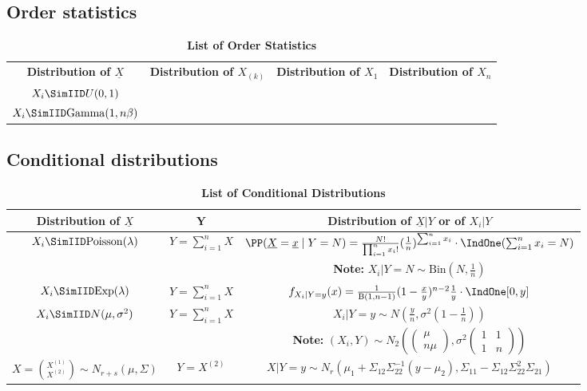 \newpage
\subsection{Order statistics}
\begin{table}[h]
	\centering
	\begin{tabular}{ c | c | c | c }
		\hline
		\textbf{Distribution of $\underline{X}$} & \textbf{Distribution of $X_{(k)}$} & \textbf{Distribution of $X_{1}$} & \textbf{Distribution of $X_{n}$}  \\ 
		$X_i \SimIID U(0,1)$ & & & \\
		$X_i \SimIID \mathrm{Gamma}(1, n\beta)$ & & & \\ 
		\hline 
	\end{tabular} 
	\caption{\textbf{List of Order Statistics}}
	\label{tab:OrderStat}
\end{table} 

\subsection{Conditional distributions}
\begin{table}[h]
	\centering
\begin{tabular}{ c | c | c }
	\hline
	\textbf{Distribution of $\underline{X}$} & $\boldsymbol{Y}$ & \textbf{Distribution of $\underline{X}|Y$ or of $X_i|Y$} \\ 
	\hline 
	  $X_i \SimIID \mathrm{Poisson}(\lambda)$  & $Y = \sum_{i=1}^n X$ & $\PP( \underline{X}=\underline{x} \mid Y=N ) = \frac{N!}{\prod_{i=1}^n x_i!} ( \frac{1}{n} )^{\sum_{i=1}^n x_i} \cdot \IndOne(\sum_{i=1}^n x_i = N)$ \\
	 & & {\textbf{Note:}  $X_i | Y = N \sim \mathrm{Bin}(N, \frac{1}{n}) $ } \\
	 $X_i \SimIID \mathrm{Exp}(\lambda)$ & $Y = \sum_{i=1}^n X$ & $f_{X_i|Y=y}(x) = \frac{1}{\mathrm{B}(1,n-1)} (1- \frac{x}{y})^{n-2}  \frac{1}{y} \cdot \IndOne[0,y]$\\
	$X_i \SimIID N(\mu, \sigma^2)$ & $Y = \sum_{i=1}^n X$ & $X_i|Y=y \sim N(\frac{y}{n}, \sigma^2(1-\frac{1}{n}))$\\
	& & {\textbf{Note:} $(X_i, Y) \sim N_2( \begin{pmatrix}
		\mu \\
		n\mu
		\end{pmatrix}, \sigma^2 \begin{pmatrix}
		1 & 1 \\
		1& n 
		\end{pmatrix} )$}\\
	$X = \binom{X^{(1)}}{X^{(2)}} \sim N_{r+s}(\mu, \Sigma )$ & $Y = X^{(2)}$ & $X|Y=y \sim N_r( \mu_1 + \Sigma_{12}\Sigma^{-1}_{22}(y-\mu_2), \Sigma_{11} - \Sigma_{12}\Sigma^2_{22} \Sigma_{21} )$\\
	\hline 
\end{tabular} 
	\caption{\textbf{List of Conditional Distributions}}
	\label{tab:CondDist}
\end{table}

